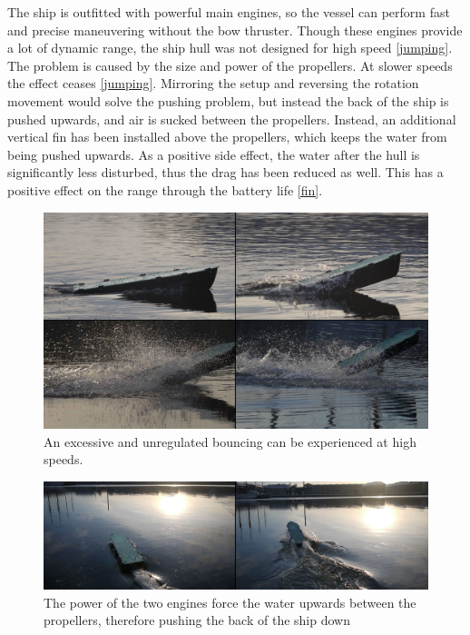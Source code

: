 The ship is outfitted with powerful main engines, so the vessel can perform fast and precise maneuvering without the bow thruster. Though these engines provide a lot of dynamic range, the ship hull was not designed for high speed \ref{jumping}. The problem is caused by the size and power of the propellers. At slower speeds the effect ceases \ref{jumping}.
Mirroring the setup and reversing the rotation movement would solve the pushing problem, but instead the back of the ship is pushed upwards, and air is sucked between the propellers. Instead, an additional vertical fin has been installed above the propellers, which keeps the water from being pushed upwards. As a positive side effect, the water after the hull is significantly less disturbed, thus the drag has been reduced as well. This has a positive effect on the range through the battery life \ref{fin}.

\begin{figure}[jumping]
	\centering
	\includegraphics[width=\textwidth]{Pictures/VerticalJumpingTele.jpg}
	\caption{An excessive and unregulated bouncing can be experienced at high speeds.}
	\label{fig:vessel-block-overview}
\end{figure}

\begin{figure}[waterpushup]
	\centering
	\includegraphics[width=\textwidth]{Pictures/Forward.jpg}
	\caption{The power of the two engines force the water upwards between the propellers, therefore pushing the back of the ship down}
	\label{fig:vessel-block-overview}
\end{figure}


